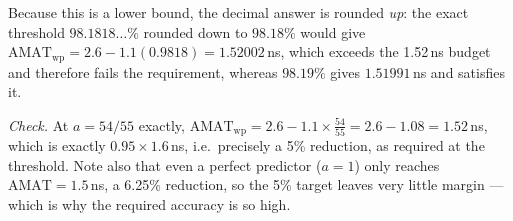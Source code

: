 \noindent
Because this is a lower bound, the decimal answer is rounded \emph{up}: the exact
threshold $98.1818\ldots\%$ rounded down to $98.18\%$ would give
$\mathrm{AMAT}_{\text{wp}} = 2.6 - 1.1(0.9818) = 1.52002$\,ns, which exceeds the 1.52\,ns
budget and therefore fails the requirement, whereas $98.19\%$ gives $1.51991$\,ns and
satisfies it.

\medskip
\noindent
\textit{Check.} At $a = 54/55$ exactly,
$\mathrm{AMAT}_{\text{wp}} = 2.6 - 1.1 \times \tfrac{54}{55} = 2.6 - 1.08 = 1.52$\,ns,
which is exactly $0.95 \times 1.6$\,ns, i.e.\ precisely a 5\% reduction, as required at
the threshold. Note also that even a perfect predictor ($a=1$) only reaches
$\mathrm{AMAT} = 1.5$\,ns, a 6.25\% reduction, so the 5\% target leaves very little
margin --- which is why the required accuracy is so high.
